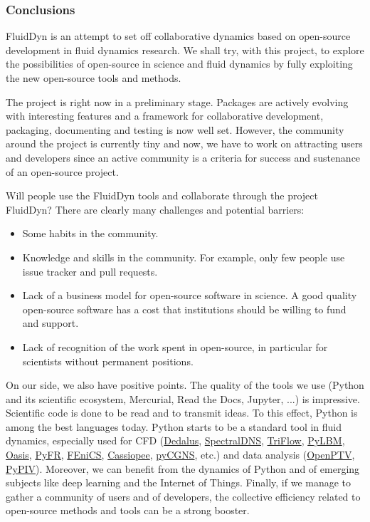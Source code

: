 \subsubsection{Conclusions}

FluidDyn is an attempt to set off collaborative dynamics based on open-source
development in fluid dynamics research.
%
We shall try, with this project, to explore the possibilities of open-source in
science and fluid dynamics by fully exploiting the new open-source tools and
methods.

The project is right now in a preliminary stage.  Packages are actively evolving
with interesting features and a framework for collaborative development,
packaging, documenting and testing is now well set.
%
However, the community around the project is currently tiny and now, we have to
work on attracting users and developers since an active community is a
criteria for success and sustenance of an open-source project.

Will people use the FluidDyn tools and collaborate through the project
FluidDyn?
%
There are clearly many challenges and potential barriers:
\begin{itemize}
\item Some habits in the community.
\item Knowledge and skills in the community. For example, only few people use
issue tracker and pull requests.
\item Lack of a business model for open-source software in science.  A good
quality open-source software has a cost that institutions should be willing
to fund and support.
\item Lack of recognition of the work spent in open-source, in particular for
scientists without permanent positions.
\end{itemize}

On our side, we also have positive points.
%
The quality of the tools we use (Python and its scientific ecosystem,
Mercurial, Read the Docs, Jupyter, ...) is impressive.
%
Scientific code is done to be read and to transmit ideas. To this effect, Python
is among the best languages today.
%
Python starts to be a standard tool in fluid dynamics, especially used for CFD
(\href{http://dedalus-project.org/}{Dedalus},
\href{https://github.com/spectralDNS}{SpectralDNS},
\href{https://pypi.org/project/triflow/}{TriFlow},
\href{http://pylbm.readthedocs.io}{PyLBM},
\href{https://github.com/mikaem/Oasis}{Oasis}, \href{http://pyfr.org/}{PyFR},
\href{https://fenicsproject.org/}{FEniCS},
\href{http://elsa.onera.fr/Cassiopee/}{Cassiopee},
\href{https://github.com/pyCGNS}{pyCGNS}, etc.) and data analysis
(\href{http://www.openptv.net/}{OpenPTV},
\href{https://github.com/jr7/pypiv}{PyPIV}).
%
Moreover, we can benefit from the dynamics of Python and of emerging subjects like
deep learning and the Internet of Things.
%
Finally, if we manage to gather a community of users and of developers, the
collective efficiency related to open-source methods and tools can be a strong
booster.

